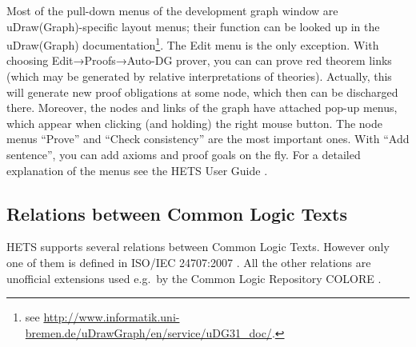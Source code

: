 \documentclass{article}
\newcommand{\normalTEXTSC}[2]{{#1\scriptsize#2}}
\newcommand     {\Hets}{\normalTEXTSC{H}{ETS}\xspace}
\begin{document}
Most of the pull-down menus of the development graph window are
uDraw(Graph)-specific layout menus; their function can be looked up in
the uDraw(Graph) documentation\footnote{see
  \url{http://www.informatik.uni-bremen.de/uDrawGraph/en/service/uDG31\_doc/}.}.
The Edit menu is the only exception. 
With choosing Edit→Proofs→Auto-DG prover, you can can prove red theorem
links (which may be generated by relative interpretations of theories).
Actually, this will generate new proof obligations at some node,
which then can be discharged there.
Moreover, the nodes and links of the
graph have attached pop-up menus, which appear when clicking (and
holding) the right mouse button. 
The node menus ``Prove'' and ``Check consistency'' are the most
important ones. With ``Add sentence'', you can add axioms and
proof goals on the fly.
For a detailed explanation of the menus
see the \Hets User Guide \cite{HetsUserGuide}.

\subsection{Relations between Common Logic Texts}
\label{relationsInCL}
\Hets supports several relations between Common Logic Texts. However only one of
them is defined in ISO/IEC 24707:2007 \cite{iso24a}. All the other relations are 
unofficial extensions used e.g.\ by the Common Logic Repository COLORE \cite{Colore}.
\end{document}
